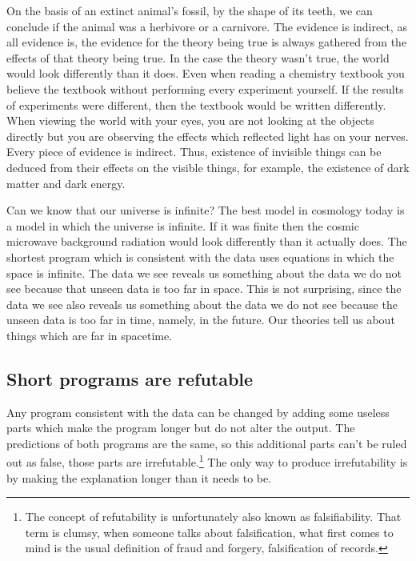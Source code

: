 On the basis of an extinct animal's fossil, by the shape of its teeth, we can conclude if the animal was a herbivore or a carnivore.
The evidence is indirect, as all evidence is, the evidence for the theory being true is always gathered from the effects of that theory being true.
In the case the theory wasn't true, the world would look differently than it does.
Even when reading a chemistry textbook you believe the textbook without performing every experiment yourself.
If the results of experiments were different, then the textbook would be written differently.
When viewing the world with your eyes, you are not looking at the objects directly but you are observing the effects which reflected light has on your nerves.
Every piece of evidence is indirect.
Thus, existence of invisible things can be deduced from their effects on the visible things, for example, the existence of dark matter and dark energy.

Can we know that our universe is infinite?
The best model in cosmology today is a model in which the universe is infinite.
If it was finite then the cosmic microwave background radiation would look differently than it actually does.
The shortest program which is consistent with the data uses equations in which the space is infinite.
The data we see reveals us something about the data we do not see because that unseen data is too far in space.
This is not surprising, since the data we see also reveals us something about the data we do not see because the unseen data is too far in time, namely, in the future.
Our theories tell us about things which are far in spacetime.

\newpage

\subsection{Short programs are refutable}

Any program consistent with the data can be changed by adding some useless parts which make the program longer but do not alter the output.
The predictions of both programs are the same, so this additional parts can't be ruled out as false, those parts are irrefutable.\footnote{
The concept of refutability is unfortunately also known as falsifiability.
That term is clumsy, when someone talks about falsification, what first comes to mind is the usual definition of fraud and forgery, falsification of records.
}
The only way to produce irrefutability is by making the explanation longer than it needs to be.

